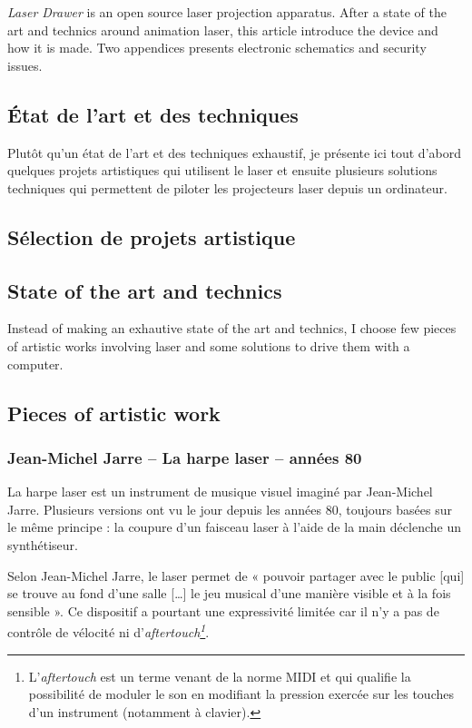 \begin{en}
\textit{Laser Drawer} is an open source laser projection apparatus. After a state of the art and technics around animation laser, this article introduce the device and how it is made. Two appendices presents electronic schematics and security issues.
\end{en}

\begin{fr}
\section{État de l'art et des techniques}
Plutôt qu'un état de l'art et des techniques exhaustif, je présente ici tout d'abord quelques projets artistiques qui utilisent le laser et ensuite plusieurs solutions techniques qui permettent de piloter les projecteurs laser depuis un ordinateur.
\subsection{Sélection de projets artistique}
\label{sec:etat_de_l_art}
\end{fr}

\begin{en}
\section{State of the art and technics}
Instead of making an exhautive state of the art and technics, I choose few pieces of artistic works involving laser and some solutions to drive them with a computer.
\subsection{Pieces of artistic work}
\label{sec:etat_de_l_art}
\end{en}

\begin{fr}
\subsubsection{Jean-Michel Jarre -- La harpe laser -- années 80}
La harpe laser est un instrument de musique visuel imaginé par Jean-Michel Jarre.
Plusieurs versions ont vu le jour depuis les années 80, toujours basées sur le même principe : la coupure d'un faisceau laser à l'aide de la main déclenche un synthétiseur.

Selon Jean-Michel Jarre, le laser permet de « pouvoir partager avec le public [qui] se trouve au fond d'une salle [\dots] le jeu musical d'une manière visible et à la fois sensible ». 
Ce dispositif a pourtant une expressivité limitée car il n'y a pas de contrôle de vélocité ni d'\textit{aftertouch\footnote{L'\textit{aftertouch} est un terme venant de la norme MIDI et qui qualifie la possibilité de moduler le son en modifiant la pression exercée sur les touches d'un instrument (notamment à clavier).}}.
\end{fr}

